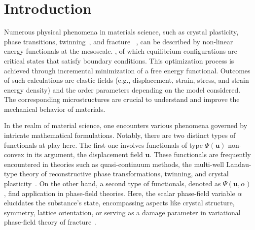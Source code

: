 \section{Introduction}
Numerous physical phenomena in materials science, such as crystal plasticity, phase transitions, twinning~\cite{Clayton2011-xq}, and fracture ~\cite{Baldelli2014-ho,Baldelli2021-gc}, can be described by non-linear energy functionals at the mesoscale. , of which equilibrium configurations are critical states that satisfy boundary conditions. This optimization process is achieved through incremental minimization of a free energy functional. Outcomes of such calculations are elastic fields
(e.g., displacement, strain, stress, and strain energy density) and the order parameters depending on the model considered. The corresponding microstructures are crucial to understand and improve the mechanical behavior of materials.

In the realm of material science, one encounters various phenomena governed by intricate mathematical formulations. Notably, there are two distinct types of functionals at play here. The first one involves functionals of type $\Psi(\mathbf u)$ non-convex in its argument, the displacement field $\mathbf u$. These functionals are frequently encountered in theories such as quasi-continuum methods, the multi-well Landau-type theory of reconstructive phase transformations, twinning, and crystal plasticity~\cite{Tadmor1996-qi,Conti2004-yj,Clayton2011-xq,Baggio2019-rs,Baggio2023-qu}. On the other hand, a second type of functionals, denoted as $\Psi(\mathbf u, \alpha)$, find application in phase-field theories. Here, the scalar phase-field variable $\alpha$ elucidates the substance's state, encompassing aspects like crystal structure, symmetry, lattice orientation, \cite{Finel2010-zw,Ruffini2015-pn,Javanbakht2016-dr} or serving as a damage parameter in variational phase-field theory of fracture~\cite{francfort_marigo1998,Salman2021-mn}. 

